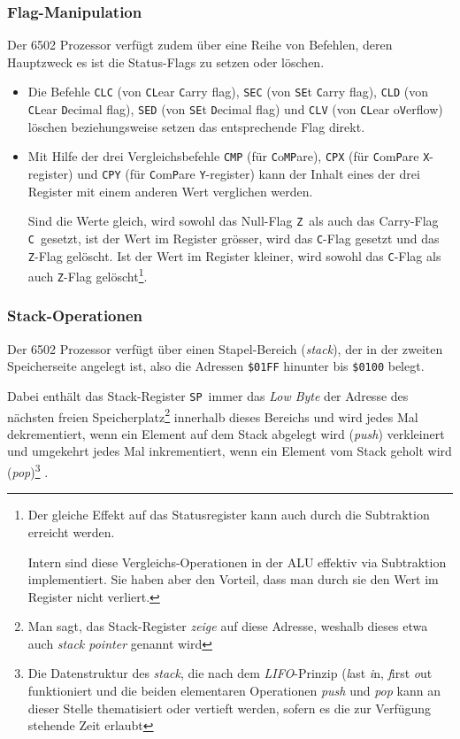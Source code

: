 \documentclass[11pt]{scrartcl}
\newcommand{\stp}{\texttt{SP}}
\newcommand{\zflag}{\texttt{Z}}
\newcommand{\cflag}{\texttt{C}}
\newcommand{\lobyte}{\emph{Low Byte}}
\newcommand{\hex}[1]{\texttt{\$#1}}
\begin{document}
\subsubsection{Flag-Manipulation}
\label{sec:flag-manipulation}

Der 6502 Prozessor verfügt zudem über eine Reihe von Befehlen, deren
Hauptzweck es ist die Status-Flags zu setzen oder löschen.

\begin{itemize}
\item Die Befehle \lstinline|CLC| (von \texttt{CL}ear \texttt{C}arry
  flag), \lstinline|SEC| (von \texttt{SE}t \texttt{C}arry flag),
  \lstinline|CLD| (von \texttt{CL}ear \texttt{D}ecimal flag),
  \lstinline!SED! (von \texttt{SE}t \texttt{D}ecimal flag) und
  \lstinline|CLV| (von \texttt{CL}ear o\texttt{V}erflow) löschen
  beziehungsweise setzen das entsprechende Flag direkt.
\item Mit Hilfe der drei Vergleichsbefehle \lstinline|CMP| (für
  \texttt{C}o\texttt{MP}are), \lstinline|CPX| (für
  \texttt{C}om\texttt{P}are \texttt{X}-register) und \lstinline|CPY|
  (für \texttt{C}om\texttt{P}are \texttt{Y}-register) kann der Inhalt
  eines der drei Register mit einem anderen Wert verglichen werden.

  Sind die Werte gleich, wird sowohl das Null-Flag \zflag\ als auch
  das Carry-Flag \cflag\ gesetzt, ist der Wert im Register grösser,
  wird das \cflag-Flag gesetzt und das \zflag-Flag gelöscht. Ist der
  Wert im Register kleiner, wird sowohl das \cflag-Flag als auch
  \zflag-Flag gelöscht\footnote{Der gleiche Effekt auf das
    Statusregister kann auch durch die Subtraktion erreicht werden.
    
    Intern sind diese Vergleichs-Operationen in der ALU effektiv via
    Subtraktion implementiert. Sie haben aber den Vorteil, dass man
    durch sie den Wert im Register nicht verliert.}.
\end{itemize}

\subsubsection{Stack-Operationen}
\label{sec:stack-operationen}

Der 6502 Prozessor verfügt über einen Stapel-Bereich (\emph{stack}),
der in der zweiten Speicherseite angelegt ist, also die Adressen
\hex{01FF} hinunter bis \hex{0100} belegt.

Dabei enthält das Stack-Register \stp\ immer das \lobyte{} der Adresse
des nächsten freien Speicherplatz\footnote{Man sagt, das
  Stack-Register \emph{zeige} auf diese Adresse, weshalb dieses etwa
  auch \emph{stack pointer} genannt wird} innerhalb dieses Bereichs
und wird jedes Mal dekrementiert, wenn ein Element auf dem Stack
abgelegt wird (\emph{push}) verkleinert und umgekehrt jedes Mal
inkrementiert, wenn ein Element vom Stack geholt wird
(\emph{pop})\footnote{Die Datenstruktur des \emph{stack}, die nach dem
  \emph{LIFO}-Prinzip (\emph{l}ast \emph{i}n, \emph{f}irst \emph{o}ut
  funktioniert und die beiden elementaren Operationen \emph{push} und
  \emph{pop} kann an dieser Stelle thematisiert oder vertieft werden,
  sofern es die zur Verfügung stehende Zeit erlaubt} .
\end{document}
